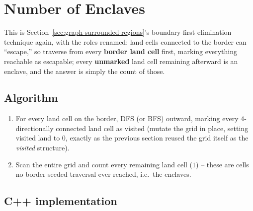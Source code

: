 \section{Number of Enclaves}
\label{sec:graph-number-of-enclaves}


\begin{patternbox}
This is Section~\ref{sec:graph-surrounded-regions}'s boundary-first
elimination technique again, with the roles renamed: land cells
connected to the border can ``escape,'' so traverse from every
\textbf{border land cell} first, marking everything reachable as
escapable; every \textbf{unmarked} land cell remaining afterward is an
enclave, and the answer is simply the count of those.
\end{patternbox}

\subsection*{Algorithm}

\begin{enumerate}
  \item For every land cell on the border, DFS (or BFS) outward,
        marking every $4$-directionally connected land cell as visited
        (mutate the grid in place, setting visited land to $0$, exactly
        as the previous section reused the grid itself as the
        \textit{visited} structure).
  \item Scan the entire grid and count every remaining land cell
        ($1$) -- these are cells no border-seeded traversal ever
        reached, i.e.\ the enclaves.
\end{enumerate}

\subsection*{C++ implementation}

